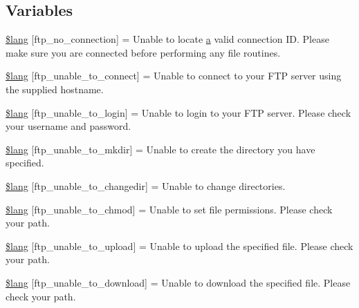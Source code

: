 \subsection*{Variables}
\begin{DoxyCompactItemize}
\item 
\hyperlink{ftp__lang_8php_a8630404f8e0c3750f8d997f35622b6eb}{\$lang} \mbox{[}\textquotesingle{}ftp\+\_\+no\+\_\+connection\textquotesingle{}\mbox{]} = \textquotesingle{}Unable to locate \hyperlink{assets_2js_2bootstrap_8min_8js_a1f5870dcf487187f13d5fd328ed9e6e7}{a} valid connection I\+D. Please make sure you are connected before performing any file routines.\textquotesingle{}
\item 
\hyperlink{ftp__lang_8php_a57d51cf019dd2e380b84c6e31cda0cf5}{\$lang} \mbox{[}\textquotesingle{}ftp\+\_\+unable\+\_\+to\+\_\+connect\textquotesingle{}\mbox{]} = \textquotesingle{}Unable to connect to your F\+T\+P server using the supplied hostname.\textquotesingle{}
\item 
\hyperlink{ftp__lang_8php_affe13cbf898e1802abb3cd9d9ce2db97}{\$lang} \mbox{[}\textquotesingle{}ftp\+\_\+unable\+\_\+to\+\_\+login\textquotesingle{}\mbox{]} = \textquotesingle{}Unable to login to your F\+T\+P server. Please check your username and password.\textquotesingle{}
\item 
\hyperlink{ftp__lang_8php_acd954089043ea7ad47397376e2630d87}{\$lang} \mbox{[}\textquotesingle{}ftp\+\_\+unable\+\_\+to\+\_\+mkdir\textquotesingle{}\mbox{]} = \textquotesingle{}Unable to create the directory you have specified.\textquotesingle{}
\item 
\hyperlink{ftp__lang_8php_a2e8eab1a2d2d33cde249097df270b7df}{\$lang} \mbox{[}\textquotesingle{}ftp\+\_\+unable\+\_\+to\+\_\+changedir\textquotesingle{}\mbox{]} = \textquotesingle{}Unable to change directories.\textquotesingle{}
\item 
\hyperlink{ftp__lang_8php_a9ffd10144a0dfd5a3c7ab69e4edf1fdf}{\$lang} \mbox{[}\textquotesingle{}ftp\+\_\+unable\+\_\+to\+\_\+chmod\textquotesingle{}\mbox{]} = \textquotesingle{}Unable to set file permissions. Please check your path.\textquotesingle{}
\item 
\hyperlink{ftp__lang_8php_a1fd0c9f4e0f3be691a809ce804900ed7}{\$lang} \mbox{[}\textquotesingle{}ftp\+\_\+unable\+\_\+to\+\_\+upload\textquotesingle{}\mbox{]} = \textquotesingle{}Unable to upload the specified file. Please check your path.\textquotesingle{}
\item 
\hyperlink{ftp__lang_8php_a65fa9f8b6a3da91390b36721c2a9775b}{\$lang} \mbox{[}\textquotesingle{}ftp\+\_\+unable\+\_\+to\+\_\+download\textquotesingle{}\mbox{]} = \textquotesingle{}Unable to download the specified file. Please check your path.\textquotesingle{}

\end{DoxyCompactItemize}
